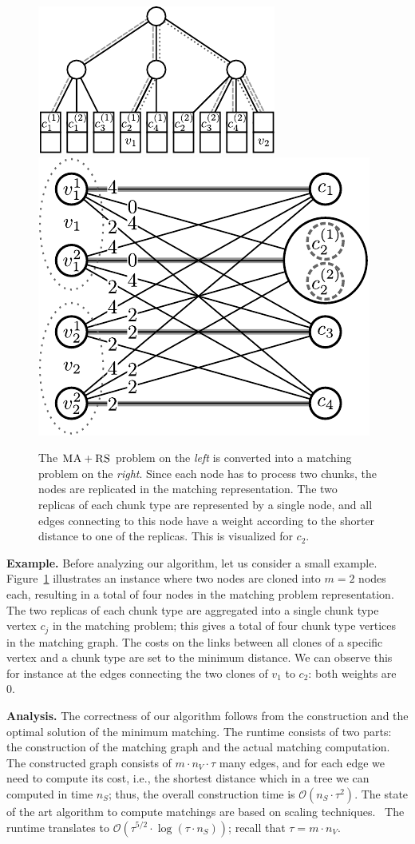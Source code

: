 \documentclass[9pt]{sigcomm-alternate}
\newcommand{\MaFactor}{m}
\newcommand{\ChunkType}{\tau}
\newcommand{\VirtualNode}{v}
\newcommand{\achunk}{\ensuremath{c}}
\newcommand{\RS}{\textsc{RS}}
\newcommand{\MA}{\textsc{MA}}
\begin{document}
\begin{figure}
\includegraphics[width = 0.49\columnwidth]{figs/model_ma_r_cv_boxes}
\hfill
\includegraphics[width =0.49\columnwidth]{figs/matching}
\caption{The $\MA+\RS$ problem on the \emph{left} is converted into a
matching problem on the \emph{right}. Since each node has to process two
chunks, the
nodes are replicated in the matching representation. The two replicas of each
chunk type are represented by a single node, and all edges connecting to this
node have a weight according to the shorter distance to one of the replicas.
This is visualized for $\achunk_2$.}
\label{fig:matching}
\end{figure}

\textbf{Example.} Before analyzing our algorithm, let us consider a small example.
Figure~\ref{fig:matching} illustrates
an instance where two nodes are
cloned into $\MaFactor = 2$ nodes each,
resulting in a total of four nodes in
the matching problem representation.
The two replicas of each chunk type are
aggregated into a single chunk type vertex $\achunk_j$  in the matching problem;
this gives a total of four chunk type vertices in the matching graph. The costs
on the links between all clones of a specific vertex and a chunk type are set to
the minimum distance. We can observe this for instance at the edges connecting
the two clones of $\VirtualNode_1$ to $\achunk_2$: both weights are 0.

\textbf{Analysis.}
The correctness of our algorithm follows from the construction and the optimal
solution of the minimum matching.
The runtime consists of two parts: the construction of the matching graph and
the actual matching computation. The constructed graph consists of
$\MaFactor \cdot n_V \cdot \ChunkType$
many edges,
and for each edge we need to compute its cost, i.e., the shortest distance
which in a tree we can computed in time $n_S$; thus, the overall construction time
is
$\mathcal{O}(n_S \cdot \tau^2)$.
The state of the art algorithm to compute matchings are based on scaling techniques.~\cite{scale-match}
The runtime translates to
$\mathcal{O}(\tau^{5/2}\cdot \log(\tau\cdot n_S))$; recall that $\tau = \MaFactor\cdot n_V$.
\end{document}
